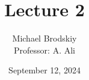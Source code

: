 


\title{Lecture 2}
\date{September 12, 2024}
\author{Michael Brodskiy\\ \small Professor: A. Ali}



\maketitle

